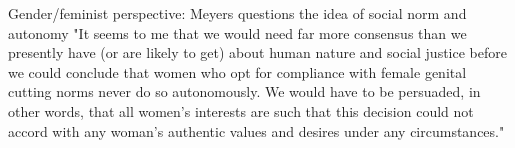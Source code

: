 \documentclass[12pt,]{article}
\begin{document}










Gender/feminist perspective:  \cite{Meye00} Meyers questions the idea of social norm and autonomy "It seems to me that we would need far more consensus than we presently have (or are likely to get) about human nature and social justice before we could conclude that women who opt for compliance with female genital cutting norms never do so autonomously.  We would have to be persuaded, in other words, that all women's interests are such that this decision could not accord with any woman's authentic values and desires under any circumstances." 
\end{document}
